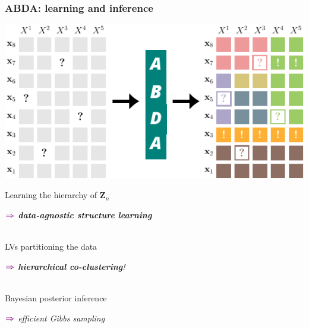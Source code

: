 \documentclass[xcolor={usenames,dvipsnames,svgnames}, compress, aspectratio=169, 11pt]{beamer}
\newcommand{\comment}[3][\small]{\begin{minipage}{1\linewidth}
          \raggedleft
          {
            $\color{violet}\boldsymbol\Rightarrow$
            #1
            {\emph{#2}}
          }
      \end{minipage}#3\\
}
\begin{document}
\begin{frame}[t, htt=bgrey2]
  \frametitle{ABDA: learning and inference}

  \large
  \begin{minipage}[t]{0.5\linewidth}
    \vspace{10pt}
    \includegraphics[width=1.07\linewidth]{figures/abda-partitioning}
  \end{minipage}\hfill\begin{minipage}[t]{0.4\linewidth}
    \raggedright
    \vspace{20pt}

    Learning the hierarchy of
    $\mathbf{Z}_{n}$\\
    \comment[\small]{\textbf{\emph{data-agnostic structure
        learning}}}{}%

  \vspace{10pt}
  LVs partitioning the data\\
  \comment[\small]{\textbf{hierarchical co-clustering}!}{}

  \vspace{10pt}
  Bayesian posterior inference\\
  \comment[\small]{efficient Gibbs sampling}{}
    
  \end{minipage}  
\end{frame}
\end{document}
